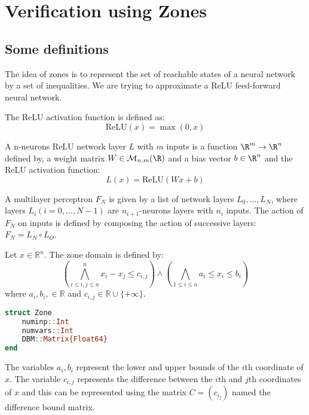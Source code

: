 \documentclass{article}
\begin{document}
\section{Verification using Zones}

\subsection{Some definitions}
The idea of zones is to represent the set of reachable states of a neural network by a set of inequalities. We are trying to approximate a ReLU feed-forward neural network.

\begin{definition}[ReLU]
    The ReLU activation function is defined as:
    \[ \text{ReLU}(x) = \max(0, x) \]
\end{definition}

\begin{definition}[Layer]
    A n-neurons ReLU network layer \(L\) with \(m\) inputs is a function 
    \(\R^m \rightarrow \R^n \) defined by, a weight matrix \(W \in \mathcal{M}_{n,m}(\R) \) and a bias vector \(b \in \R^n \) and the ReLU activation function:
    \[L(x) = \text{ReLU}(Wx + b) \]
\end{definition}

\begin{definition}
    A multilayer perceptron \(F_N\) is given by a list of network layers \(L_0,\dots,L_N\), where layers \(L_i (i = 0,\dots,N-1) \) are \(n_{i+1}\)-neurons layers with \(n_i\) inputs. The action of \(F_N\) on inputs is defined by composing the action of successive layers: \(F_N = L_N \circ L_O\).
\end{definition}



\begin{definition}
    Let \(x \in \mathbb{R}^n \). The zone domain is defined by:
    \[(\bigwedge_{i\leq i,j\leq n}^n x_i - x_j \leq c_{i,j}) \land (\bigwedge_{1\leq i\leq n} a_i \leq x_i \leq b_i)\]
    where \(a_i, b_i,  \in \mathbb{R} \) and \(c_{i,j} \in \mathbb{R} \cup \{+\infty\} \).
\end{definition}

\begin{lstlisting}[language= Julia]
struct Zone
    numinp::Int
    numvars::Int
    DBM::Matrix{Float64}
end
\end{lstlisting}

The variables \(a_i, b_i \) represent the lower and upper bounds of the \(i \)th coordinate of \(x \).
The variable \(c_{i,j} \) represents the difference between the \(i \)th and \(j \)th coordinates of \(x \) and this can be represented using the matrix \(C = (c_{i_j})\) named the difference bound matrix.
\end{document}
